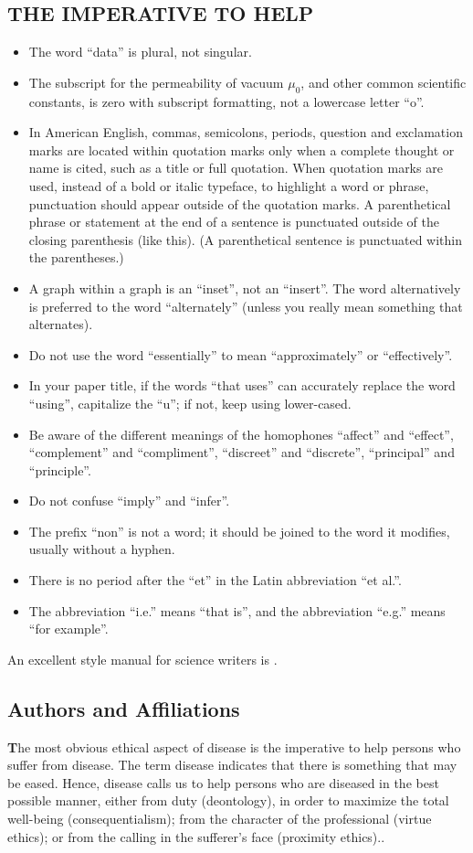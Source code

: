 \documentclass[conference]{IEEEtran}
\begin{document}
\subsection{THE IMPERATIVE TO HELP}\label{SCM}
\begin{itemize}
\item The word ``data'' is plural, not singular.
\item The subscript for the permeability of vacuum $\mu_{0}$, and other common scientific constants, is zero with subscript formatting, not a lowercase letter ``o''.
\item In American English, commas, semicolons, periods, question and exclamation marks are located within quotation marks only when a complete thought or name is cited, such as a title or full quotation. When quotation marks are used, instead of a bold or italic typeface, to highlight a word or phrase, punctuation should appear outside of the quotation marks. A parenthetical phrase or statement at the end of a sentence is punctuated outside of the closing parenthesis (like this). (A parenthetical sentence is punctuated within the parentheses.)
\item A graph within a graph is an ``inset'', not an ``insert''. The word alternatively is preferred to the word ``alternately'' (unless you really mean something that alternates).
\item Do not use the word ``essentially'' to mean ``approximately'' or ``effectively''.
\item In your paper title, if the words ``that uses'' can accurately replace the word ``using'', capitalize the ``u''; if not, keep using lower-cased.
\item Be aware of the different meanings of the homophones ``affect'' and ``effect'', ``complement'' and ``compliment'', ``discreet'' and ``discrete'', ``principal'' and ``principle''.
\item Do not confuse ``imply'' and ``infer''.
\item The prefix ``non'' is not a word; it should be joined to the word it modifies, usually without a hyphen.
\item There is no period after the ``et'' in the Latin abbreviation ``et al.''.
\item The abbreviation ``i.e.'' means ``that is'', and the abbreviation ``e.g.'' means ``for example''.
\end{itemize}
An excellent style manual for science writers is \cite{b7}.

\subsection{Authors and Affiliations}
\textbf The most obvious ethical aspect of disease is the imperative to help persons who suffer from disease. The term disease indicates that there is something that may be eased. Hence, disease calls us to help persons who are diseased in the best possible manner, either from duty (deontology), in order to maximize the total well-being (consequentialism); from the character of the professional (virtue ethics); or from the calling in the sufferer’s face (proximity ethics)..
\end{document}
